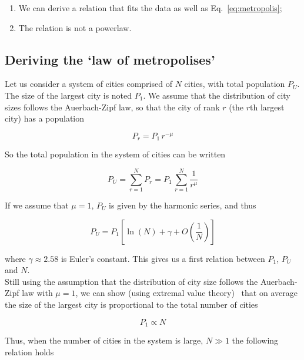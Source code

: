 \begin{enumerate}
    \item We can derive a relation that fits the data as well as
        Eq.~\ref{eq:metropolis};
    \item The relation is not a powerlaw.
\end{enumerate}



\subsection{Deriving the `law of metropolises'}
\label{sub:deriving_the_law_of_metropolises_}

Let us consider a system of cities comprised of $N$ cities, with total
population $P_U$. The size of the largest city is noted $P_1$. We assume that
the distribution of city sizes follows the Auerbach-Zipf law, so that the city
of rank $r$ (the $r$th largest city) has a population

\begin{equation*}
    P_r = P_1\,r^{-\mu}
\end{equation*}

So the total population in the system of cities can be written

\begin{equation}
    P_U = \sum_{r=1}^N P_r = P_1\,\sum_{r=1}^{N} \frac{1}{r^\mu}
\end{equation}

If we assume that $\mu=1$, $P_U$ is given by the harmonic series, and thus

\begin{equation}
    P_U = P_1 \left[ \ln(N) + \gamma + O\left(\frac{1}{N}\right)\right]
\end{equation}

where $\gamma \approx 2.58$ is Euler's constant. This gives us a first relation
between $P_1$, $P_U$ and $N$.\\

Still using the assumption that the distribution of city size follows the
Auerbach-Zipf law with $\mu=1$, we can show (using extremal value
theory)~\cite{Clauset:2009} that on average the size of the largest city is proportional to the total
number of cities

\begin{equation*}
    P_1 \propto N
\end{equation*}

Thus, when the number of cities in the system is large, $N \gg 1$ the following
relation holds 

